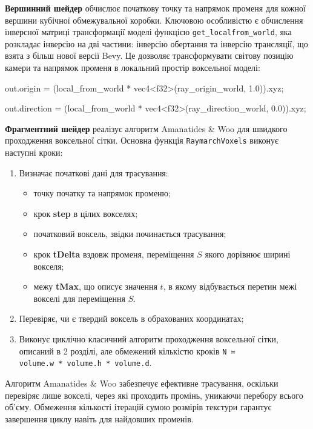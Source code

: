 \textbf{Вершинний шейдер} обчислює початкову точку та напрямок променя для кожної вершини кубічної обмежувальної коробки. Ключовою особливістю є обчислення інверсної матриці трансформації моделі функцією \texttt{get\_local\-from\_world}, яка розкладає інверсію на дві частини: інверсію обертання та інверсію трансляції, що взята з більш нової версії Bevy. Це дозволяє трансформувати світову позицію камери та напрямок променя в локальний простір воксельної моделі:

\begin{rustcode}
out.origin = (local_from_world * 
    vec4<f32>(ray_origin_world, 1.0)).xyz;

out.direction = (local_from_world * 
    vec4<f32>(ray_direction_world, 0.0)).xyz;
\end{rustcode}

\textbf{Фрагментний шейдер} реалізує алгоритм Amanatides \& Woo для швидкого проходження воксельної сітки. Основна функція \texttt{RaymarchVoxels} виконує наступні кроки:

\begin{enumerate}[itemsep=0pt, topsep=0pt]
    \item Визначає початкові дані для трасування: 
    \begin{itemize}[itemsep=0pt, topsep=0pt, label=$\diamond$]
        \item точку початку та напрямок променю;
        \item крок \textbf{step} в цілих вокселях;
        \item початковий воксель, звідки починається трасування;
        \item крок \textbf{tDelta} вздовж променя, переміщення $S$ якого дорівнює ширині вокселя;
        \item межу \textbf{tMax}, що описує значення $t$, в якому відбувається перетин межі вокселі для переміщення $S$.
    \end{itemize}
    \item Перевіряє, чи є твердий воксель в обрахованих координатах;
    \item Виконує циклічно класичний алгоритм проходження воксельної сітки, описаний в 2 розділі, але обмежений кількістю кроків \texttt{N = \\volume.w * volume.h * volume.d}.
\end{enumerate}

Алгоритм Amanatides \& Woo забезпечує ефективне трасування, оскільки перевіряє лише вокселі, через які проходить промінь, уникаючи перебору всього об'єму. Обмеження кількості ітерацій сумою розмірів текстури гарантує завершення циклу навіть для найдовших променів.


